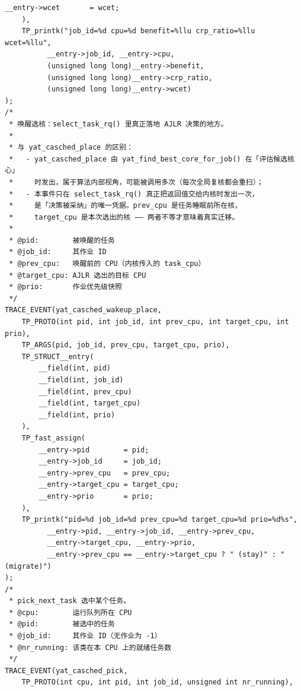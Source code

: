 \documentclass[10pt,a4paper]{article}
\newenvironment{yatpage}{\vspace*{0pt}}{\par}
\begin{document}
\begin{yatpage}
\begin{Verbatim}[fontsize=\fontsize{8.2}{9.8}\selectfont]
		__entry->wcet		= wcet;
	),
	TP_printk("job_id=%d cpu=%d benefit=%llu crp_ratio=%llu wcet=%llu",
		  __entry->job_id, __entry->cpu,
		  (unsigned long long)__entry->benefit,
		  (unsigned long long)__entry->crp_ratio,
		  (unsigned long long)__entry->wcet)
);
/*
 * 唤醒选核：select_task_rq() 里真正落地 AJLR 决策的地方。
 *
 * 与 yat_casched_place 的区别：
 *   - yat_casched_place 由 yat_find_best_core_for_job() 在「评估候选核心」
 *     时发出，属于算法内部视角，可能被调用多次（每次全局复核都会重扫）；
 *   - 本事件只在 select_task_rq() 真正把返回值交给内核时发出一次，
 *     是「决策被采纳」的唯一凭据。prev_cpu 是任务睡眠前所在核，
 *     target_cpu 是本次选出的核 —— 两者不等才意味着真实迁移。
 *
 * @pid:        被唤醒的任务
 * @job_id:     其作业 ID
 * @prev_cpu:   唤醒前的 CPU（内核传入的 task_cpu）
 * @target_cpu: AJLR 选出的目标 CPU
 * @prio:       作业优先级快照
 */
TRACE_EVENT(yat_casched_wakeup_place,
	TP_PROTO(int pid, int job_id, int prev_cpu, int target_cpu, int prio),
	TP_ARGS(pid, job_id, prev_cpu, target_cpu, prio),
	TP_STRUCT__entry(
		__field(int, pid)
		__field(int, job_id)
		__field(int, prev_cpu)
		__field(int, target_cpu)
		__field(int, prio)
	),
	TP_fast_assign(
		__entry->pid		= pid;
		__entry->job_id		= job_id;
		__entry->prev_cpu	= prev_cpu;
		__entry->target_cpu	= target_cpu;
		__entry->prio		= prio;
	),
	TP_printk("pid=%d job_id=%d prev_cpu=%d target_cpu=%d prio=%d%s",
		  __entry->pid, __entry->job_id, __entry->prev_cpu,
		  __entry->target_cpu, __entry->prio,
		  __entry->prev_cpu == __entry->target_cpu ? " (stay)" : " (migrate)")
);
/*
 * pick_next_task 选中某个任务。
 * @cpu:        运行队列所在 CPU
 * @pid:        被选中的任务
 * @job_id:     其作业 ID（无作业为 -1）
 * @nr_running: 该类在本 CPU 上的就绪任务数
 */
TRACE_EVENT(yat_casched_pick,
	TP_PROTO(int cpu, int pid, int job_id, unsigned int nr_running),
\end{Verbatim}
\end{yatpage}
\newpage
\end{document}
